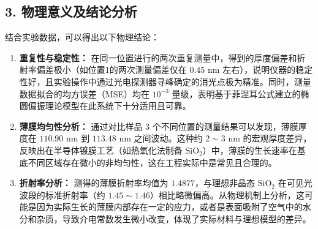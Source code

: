 \documentclass[11pt]{article}
\begin{document}
\subsection*{3. 物理意义及结论分析}
结合实验数据，可以得出以下物理结论：
\begin{enumerate}
    \item \textbf{重复性与稳定性：} 在同一位置进行的两次重复测量中，得到的厚度偏差和折射率偏差极小（如位置1的两次测量偏差仅在 $0.45\text{ nm}$ 左右），说明仪器的稳定性好，且实验操作中通过光电探测器寻峰确定的消光点极为精准。同时，测量数据拟合的均方误差（MSE）均在 $10^{-3}$ 量级，表明基于菲涅耳公式建立的椭圆偏振理论模型在此系统下十分适用且可靠。
    \item \textbf{薄膜均匀性分析：} 通过对比样品 3 个不同位置的测量结果可以发现，薄膜厚度在 $110.90\text{ nm}$ 到 $113.48\text{ nm}$ 之间波动。这种约 $2\sim 3\text{ nm}$ 的宏观厚度差异，反映出在半导体镀膜工艺（如热氧化法制备 $\text{SiO}_2$）中，薄膜的生长速率在基底不同区域存在微小的非均匀性，这在工程实际中是常见且合理的。
    \item \textbf{折射率分析：} 测得的薄膜折射率均值为 $1.4877$，与理想非晶态 $\text{SiO}_2$ 在可见光波段的标准折射率（约 $1.45\sim 1.46$）相比略微偏高。从物理机制上分析，这可能是因为实际生长的薄膜内部存在一定的应力，或者是表面吸附了空气中的水分和杂质，导致介电常数发生微小改变，体现了实际材料与理想模型的差异。
\end{enumerate}
\end{document}
